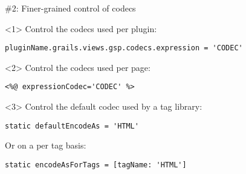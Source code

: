 \begin{frame}

    \begin{center}
      \Huge \#2: Finer-grained control of codecs
    \end{center}

    \vspace{1cm}

    \begin{onlyenv}<1>
      Control the codecs used per plugin:
      \begin{center}
        \begin{minipage}{\textwidth}
          \begin{verbatim}
pluginName.grails.views.gsp.codecs.expression = 'CODEC'
          \end{verbatim}
        \end{minipage}
      \end{center}
    \end{onlyenv}

    \begin{onlyenv}<2>
      Control the codecs used per page:
      \begin{center}
        \begin{minipage}{\textwidth}
          \begin{verbatim}
<%@ expressionCodec='CODEC' %>
          \end{verbatim}
        \end{minipage}
      \end{center}
    \end{onlyenv}

    \begin{onlyenv}<3>
      Control the default codec used by a tag library:
      \begin{center}
        \begin{minipage}{\textwidth}
          \begin{verbatim}
static defaultEncodeAs = 'HTML'
          \end{verbatim}
        \end{minipage}
      \end{center}

      Or on a per tag basis:
      \begin{center}
        \begin{minipage}{\textwidth}
          \begin{verbatim}
static encodeAsForTags = [tagName: 'HTML']
          \end{verbatim}
        \end{minipage}
      \end{center}
    \end{onlyenv}


\end{frame}
